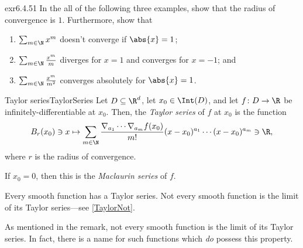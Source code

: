 \begin{exr}{}{exr6.4.51}
In the all of the following three examples, show that the radius of convergence is $1$.  Furthermore, show that
\begin{enumerate}
\item $\sum _{m\in \N}x^m$ doesn't converge if $\abs{x}=1$;
\item $\sum _{m\in \N}\frac{x^m}{m}$ diverges for $x=1$ and converges for $x=-1$; and
\item $\sum _{m\in \N}\frac{x^m}{m^2}$ converges absolutely for $\abs{x}=1$.
\end{enumerate}
\end{exr}
\begin{dfn}{Taylor series}{TaylorSeries}
Let $D\subseteq \R ^d$, let $x_0\in \Int (D)$, and let $f\colon D\rightarrow \R$ be infinitely-differentiable at $x_0$.  Then, the \emph{Taylor series} of $f$ at $x_0$ is the function
\begin{equation}\label{Taylor}
B_r(x_0)\ni x\mapsto \sum _{m\in \N}\frac{\nabla _{a_1}\cdots \nabla _{a_m}f(x_0)}{m!}(x-x_0)^{a_1}\cdots (x-x_0)^{a_m}\ni \R ,
\end{equation}
where $r$ is the radius of convergence.
\begin{rmk}
If $x_0=0$, then this is the \emph{Maclaurin series} of $f$.
\end{rmk}
\begin{rmk}
Every smooth function has a Taylor series.  Not every smooth function is the limit of its Taylor series---see \cref{TaylorNot}.
\end{rmk}
\end{dfn}
As mentioned in the remark, not every smooth function is the limit of its Taylor series.  In fact, there is a name for such functions which \emph{do} possess this property.
